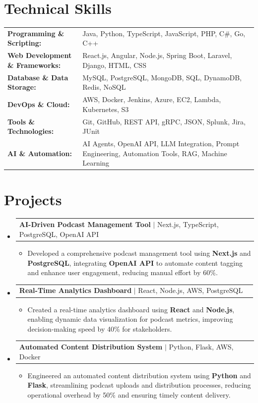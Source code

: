 \documentclass[letterpaper,10pt]{article}
\makeatletter
\newcommand{\resumeItem}[1]{
  \item{\fontsize{8pt}{9pt}\selectfont
    #1 \vspace{-3pt}
  }
}
\newcommand{\resumeProjectHeading}[2]{
    \item
    \begin{tabular*}{1.001\textwidth}{l@{\extracolsep{\fill}}r}
      \fontsize{8.5pt}{10pt}#1 & \textbf{\fontsize{8.5pt}{10pt} #2}\\
    \end{tabular*}\vspace{-7pt}
}
\newcommand{\resumeSubHeadingListStart}{\begin{itemize}[leftmargin=0pt, label={}]}
\newcommand{\resumeSubHeadingListEnd}{\end{itemize}}
\newcommand{\resumeItemListStart}{\begin{itemize}[leftmargin=*]}
\newcommand{\resumeItemListEnd}{\end{itemize}\vspace{-5pt}}
\makeatother
\begin{document}
\section{Technical Skills}
        \vspace{-14pt}
        \begin{table}[h]
            \fontsize{8pt}{9pt}\selectfont
            \begin{tabular}{p{0.3\linewidth} p{0.7\linewidth}}
                \textbf{Programming \& Scripting:} & Java, Python, TypeScript, JavaScript, PHP, C\#, Go, C++ \\
                \textbf{Web Development \& Frameworks:} & React.js, Angular, Node.js, Spring Boot, Laravel, Django, HTML, CSS \\
                \textbf{Database \& Data Storage:} & MySQL, PostgreSQL, MongoDB, SQL, DynamoDB, Redis, NoSQL \\
                \textbf{DevOps \& Cloud:} & AWS, Docker, Jenkins, Azure, EC2, Lambda, Kubernetes, S3 \\
                \textbf{Tools \& Technologies:} & Git, GitHub, REST API, gRPC, JSON, Splunk, Jira, JUnit \\
                \textbf{AI \& Automation:} & AI Agents, OpenAI API, LLM Integration, Prompt Engineering, Automation Tools, RAG, Machine Learning \\
            \end{tabular}
        \end{table}
 \vspace{-18pt}

\section{Projects}
    \vspace{-5pt}
    \resumeSubHeadingListStart
          \resumeProjectHeading
            {\textbf{AI-Driven Podcast Management Tool} $|$ Next.js, TypeScript, PostgreSQL, OpenAI API}{}
            \resumeItemListStart
                \resumeItem{Developed a comprehensive podcast management tool using \textbf{Next.js} and \textbf{PostgreSQL}, integrating \textbf{OpenAI API} to automate content tagging and enhance user engagement, reducing manual effort by 60\%.}
            \resumeItemListEnd
        \vspace{-12pt}
    
        \resumeProjectHeading
            {\textbf{Real-Time Analytics Dashboard} $|$ React, Node.js, AWS, PostgreSQL}{}
        \resumeItemListStart
                \resumeItem{Created a real-time analytics dashboard using \textbf{React} and \textbf{Node.js}, enabling dynamic data visualization for podcast metrics, improving decision-making speed by 40\% for stakeholders.}
        \resumeItemListEnd
      \vspace{-12pt}
      \resumeProjectHeading
        {\textbf{Automated Content Distribution System} $|$ Python, Flask, AWS, Docker}{}
    \resumeItemListStart
            \resumeItem{Engineered an automated content distribution system using \textbf{Python} and \textbf{Flask}, streamlining podcast uploads and distribution processes, reducing operational overhead by 50\% and ensuring timely content delivery.}
    \resumeItemListEnd
    \resumeSubHeadingListEnd
\end{document}
